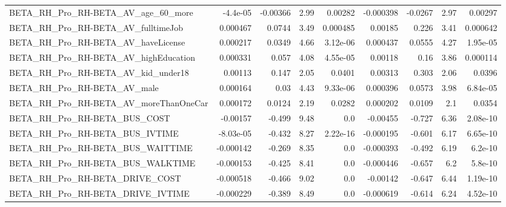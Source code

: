\begin{tabular}{lrrrrrrrr}
BETA\_RH\_Pro\_RH-BETA\_AV\_age\_60\_more                 &    -4.4e-05 &     -0.00366 &     2.99 &  0.00282 &  -0.000398 &     -0.0267 &         2.97 &       0.00297 \\
BETA\_RH\_Pro\_RH-BETA\_AV\_fulltimeJob                 &    0.000467 &       0.0744 &     3.49 & 0.000485 &    0.00185 &       0.226 &         3.41 &      0.000642 \\
BETA\_RH\_Pro\_RH-BETA\_AV\_haveLicense                 &    0.000217 &       0.0349 &     4.66 & 3.12e-06 &   0.000437 &      0.0555 &         4.27 &      1.95e-05 \\
BETA\_RH\_Pro\_RH-BETA\_AV\_highEducation               &    0.000331 &        0.057 &     4.08 & 4.55e-05 &    0.00118 &        0.16 &         3.86 &      0.000114 \\
BETA\_RH\_Pro\_RH-BETA\_AV\_kid\_under18                 &     0.00113 &        0.147 &     2.05 &   0.0401 &    0.00313 &       0.303 &         2.06 &        0.0396 \\
BETA\_RH\_Pro\_RH-BETA\_AV\_male                        &    0.000164 &         0.03 &     4.43 & 9.33e-06 &   0.000396 &      0.0573 &         3.98 &      6.84e-05 \\
BETA\_RH\_Pro\_RH-BETA\_AV\_moreThanOneCar              &    0.000172 &       0.0124 &     2.19 &   0.0282 &   0.000202 &      0.0109 &          2.1 &        0.0354 \\
BETA\_RH\_Pro\_RH-BETA\_BUS\_COST                       &    -0.00157 &       -0.499 &     9.48 &      0.0 &   -0.00455 &      -0.727 &         6.36 &      2.08e-10 \\
BETA\_RH\_Pro\_RH-BETA\_BUS\_IVTIME                     &   -8.03e-05 &       -0.432 &     8.27 & 2.22e-16 &  -0.000195 &      -0.601 &         6.17 &      6.65e-10 \\
BETA\_RH\_Pro\_RH-BETA\_BUS\_WAITTIME                   &   -0.000142 &       -0.269 &     8.35 &      0.0 &  -0.000393 &      -0.492 &         6.19 &       6.2e-10 \\
BETA\_RH\_Pro\_RH-BETA\_BUS\_WALKTIME                   &   -0.000153 &       -0.425 &     8.41 &      0.0 &  -0.000446 &      -0.657 &          6.2 &       5.8e-10 \\
BETA\_RH\_Pro\_RH-BETA\_DRIVE\_COST                     &   -0.000518 &       -0.466 &     9.02 &      0.0 &   -0.00142 &      -0.647 &         6.44 &      1.19e-10 \\
BETA\_RH\_Pro\_RH-BETA\_DRIVE\_IVTIME                   &   -0.000229 &       -0.389 &     8.49 &      0.0 &  -0.000619 &      -0.614 &         6.24 &      4.52e-10 \\

\end{tabular}
